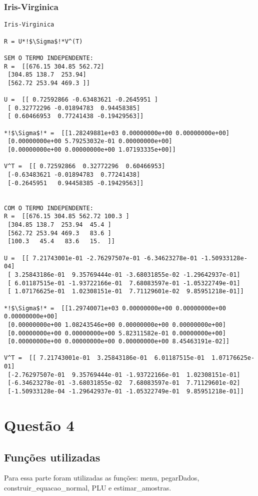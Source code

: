 \documentclass[a4paper,12pt,twoside]{article}
\begin{document}
\subsubsection{Iris-Virginica}
\begin{lstlisting}
Iris-Virginica

R = U*!$\Sigma$!*V^(T)

SEM O TERMO INDEPENDENTE: 
R =  [[676.15 304.85 562.72]
 [304.85 138.7  253.94]
 [562.72 253.94 469.3 ]]

U =  [[ 0.72592866 -0.63483621 -0.2645951 ]
 [ 0.32772296 -0.01894783  0.94458385]
 [ 0.60466953  0.77241438 -0.19429563]]

*!$\Sigma$!* =  [[1.28249881e+03 0.00000000e+00 0.00000000e+00]
 [0.00000000e+00 5.79253032e-01 0.00000000e+00]
 [0.00000000e+00 0.00000000e+00 1.07193335e+00]]

V^T =  [[ 0.72592866  0.32772296  0.60466953]
 [-0.63483621 -0.01894783  0.77241438]
 [-0.2645951   0.94458385 -0.19429563]]


COM O TERMO INDEPENDENTE: 
R =  [[676.15 304.85 562.72 100.3 ]
 [304.85 138.7  253.94  45.4 ]
 [562.72 253.94 469.3   83.6 ]
 [100.3   45.4   83.6   15.  ]]

U =  [[ 7.21743001e-01 -2.76297507e-01 -6.34623278e-01 -1.50933128e-04]
 [ 3.25843186e-01  9.35769444e-01 -3.68031855e-02 -1.29642937e-01]
 [ 6.01187515e-01 -1.93722166e-01  7.68083597e-01 -1.05322749e-01]
 [ 1.07176625e-01  1.02308151e-01  7.71129601e-02  9.85951218e-01]]

*!$\Sigma$!* =  [[1.29740071e+03 0.00000000e+00 0.00000000e+00 0.00000000e+00]
 [0.00000000e+00 1.08243546e+00 0.00000000e+00 0.00000000e+00]
 [0.00000000e+00 0.00000000e+00 5.82311582e-01 0.00000000e+00]
 [0.00000000e+00 0.00000000e+00 0.00000000e+00 8.45463191e-02]]

V^T =  [[ 7.21743001e-01  3.25843186e-01  6.01187515e-01  1.07176625e-01]
 [-2.76297507e-01  9.35769444e-01 -1.93722166e-01  1.02308151e-01]
 [-6.34623278e-01 -3.68031855e-02  7.68083597e-01  7.71129601e-02]
 [-1.50933128e-04 -1.29642937e-01 -1.05322749e-01  9.85951218e-01]]
\end{lstlisting}

\section{Questão 4}
\subsection{Funções utilizadas}
Para essa parte foram utilizadas as funções: menu, pegarDados, construir\_equacao\_normal, PLU e estimar\_amostras.
\end{document}
